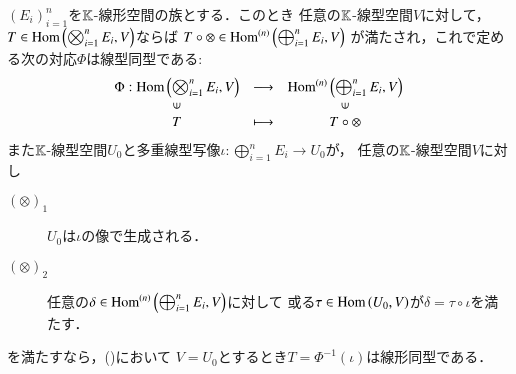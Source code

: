 	\begin{screen}
		\begin{thm}[普遍性]\label{thm:universality_of_tensor_product}
			$(E_i)_{i=1}^n$を$\K$-線形空間の族とする．このとき
			任意の$\K$-線型空間$V$に対して，$T \in \Hom{\bigotimes_{i=1}^n E_i}{V}$ならば
			$T \circ \otimes \in \Ln{\bigoplus_{i=1}^n E_i}{V}{n}$
			が満たされ，これで定める次の対応$\Phi$は線型同型である:
			\begin{align}
				\begin{array}{ccc}
					\Phi:\Hom{\bigotimes_{i=1}^n E_i}{V} & \longrightarrow & \Ln{\bigoplus_{i=1}^n E_i}{V}{n} \\
					\rotatebox{90}{$\in$} & & \rotatebox{90}{$\in$} \\
					T & \longmapsto & T \circ \otimes 
					\label{eq:thm_universality_of_tensor_product}
				\end{array}
			\end{align}
			また$\K$-線型空間$U_0$と多重線型写像$\iota:\bigoplus_{i=1}^n E_i \longrightarrow U_0$が，
			任意の$\K$-線型空間$V$に対し
			\begin{description}
				\item[$(\otimes)_1$] $U_0$は$\iota$の像で生成される．
				\item[$(\otimes)_2$] 任意の$\delta \in \Ln{\bigoplus_{i=1}^n E_i}{V}{n}$に対して
					或る$\tau \in \Hom{U_0}{V}$が$\delta = \tau \circ \iota$を満たす．
			\end{description}
			を満たすなら，()において
			$V = U_0$とするとき$T = \Phi^{-1}(\iota)$は線形同型である．
		\end{thm}
	\end{screen}
	
